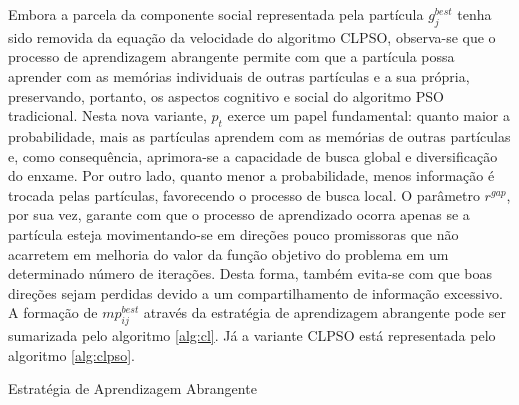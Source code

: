 \documentclass[
	12pt,				%
	openany,			%
	twoside,			%
	a4paper,			%
	chapter=TITLE,		%
	section=Title,		%
	subsection=Title,	%
	subsubsection=Title,%
	english,			%
	french,				%
	spanish,			%
	brazil			%
	]{abntex2}
\begin{document}
\begin{ERRATA}
Embora a parcela da componente social representada pela partícula $g^{best}_j$ tenha sido removida da equação da velocidade do algoritmo CLPSO, observa-se que o processo de aprendizagem abrangente permite com que a partícula possa aprender com as memórias individuais de outras partículas e a sua própria, preservando, portanto, os aspectos cognitivo e social do algoritmo PSO tradicional. Nesta nova variante, $p_t$ exerce um papel fundamental: quanto maior a probabilidade, mais as partículas aprendem com as memórias de outras partículas e, como consequência, aprimora-se a capacidade de busca global e diversificação do enxame. Por outro lado, quanto menor a probabilidade, menos informação é trocada pelas partículas, favorecendo o processo de busca local. O parâmetro $r^{gap}$, por sua vez, garante com que o processo de aprendizado ocorra apenas se a partícula esteja movimentando-se em direções pouco promissoras que não acarretem em melhoria do valor da função objetivo do problema em um determinado número de iterações. Desta forma, também evita-se com que boas direções sejam perdidas devido a um compartilhamento de informação excessivo. A formação de $mp^{best}_{ij}$ através da estratégia de aprendizagem abrangente pode ser sumarizada pelo algoritmo \ref{alg:cl}. Já a variante CLPSO está representada pelo algoritmo \ref{alg:clpso}.


\begin{algorithm}[!h]

\caption{\label{alg:cl} Estratégia de Aprendizagem Abrangente}



\end{algorithm}
\end{ERRATA}
\end{document}
